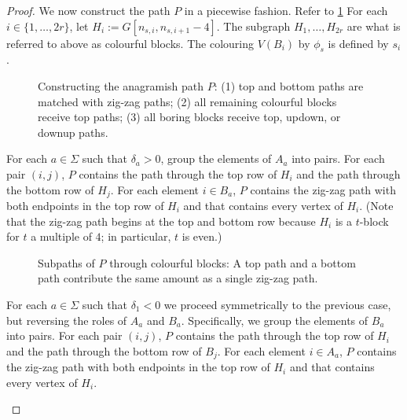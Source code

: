 \documentclass{patmorin}
\begin{document}
\begin{proof}
    We now construct the path $P$ in a piecewise fashion.  Refer to \cref{path_construction}  For each $i\in\{1,\ldots,2r\}$, let $H_i:=G[n_{s,i},n_{s,i+1}-4]$. The subgraph $H_1,\ldots,H_{2r}$ are what is referred to above as colourful blocks.  The colouring $V(B_i)$ by $\phi_s$ is defined by $s_i$.
    \begin{figure}
        \caption{Constructing the anagramish path $P$:
            (1) top and bottom paths are matched with zig-zag paths;
            (2) all remaining colourful blocks receive top paths;
            (3) all boring blocks receive top, updown, or downup paths.
        }
        \label{path_construction}
    \end{figure}
    \begin{compactenum}
        \item For each $a\in\Sigma$ such that $\delta_a>0$, group the elements of $A_a$ into pairs.  For each pair $(i,j)$, $P$ contains the path through the top row of $H_i$ and the path through the bottom row of $H_j$.  For each element $i\in B_a$, $P$ contains the zig-zag path with both endpoints in the top row of $H_i$ and that contains every vertex of $H_i$.  (Note that the zig-zag path begins at the top and bottom row because $H_i$ is a $t$-block for $t$ a multiple of $4$; in particular, $t$ is even.)

        \begin{figure}
            \caption{Subpaths of $P$ through colourful blocks: A top path and a bottom path contribute the same amount as a single zig-zag path.}
        \end{figure}

        \item For each $a\in\Sigma$ such that $\delta_1<0$ we proceed symmetrically to the previous case, but reversing the roles of $A_a$ and $B_a$.  Specifically, we group the elements of $B_a$ into pairs.  For each pair $(i,j)$, $P$ contains the path through the top row of $H_i$ and the path through the bottom row of $B_j$.  For each element $i\in A_a$, $P$ contains the zig-zag path with both endpoints in the top row of $H_i$ and that contains every vertex of $H_i$.


\end{compactenum}
\end{proof}
\end{document}
